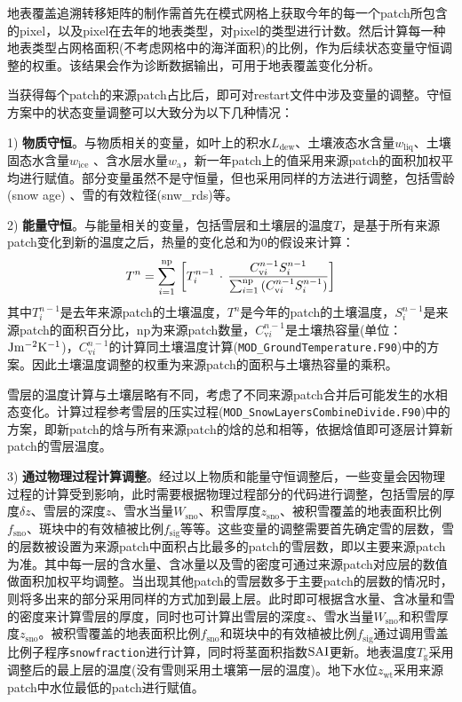 地表覆盖追溯转移矩阵的制作需首先在模式网格上获取今年的每一个patch所包含的pixel，以及pixel在去年的地表类型，对pixel的类型进行计数。然后计算每一种地表类型占网格面积(不考虑网格中的海洋面积)的比例，作为后续状态变量守恒调整的权重。该结果会作为诊断数据输出，可用于地表覆盖变化分析。

当获得每个patch的来源patch占比后，即可对restart文件中涉及变量的调整。守恒方案中的状态变量调整可以大致分为以下几种情况：


1) \textbf{物质守恒}。与物质相关的变量，如叶上的积水$L_{\mathrm{dew}}$、土壤液态水含量$w_{\mathrm{liq}}$、土壤固态水含量$w_{\mathrm{ice}}$
、含水层水量$w_{\mathrm{a}}$，新一年patch上的值采用来源patch的面积加权平均进行赋值。部分变量虽然不是守恒量，但也采用同样的方法进行调整，包括雪龄 (snow age) 、雪的有效粒径(snw\_rds)等。

2) \textbf{能量守恒}。与能量相关的变量，包括雪层和土壤层的温度$T$，是基于所有来源patch变化到新的温度之后，热量的变化总和为0的假设来计算：
\begin{equation}
  T^{n} = \sum_{i = 1}^{\rm np}{\,\left[ T_{i}^{n - 1}\,\cdot\,\frac{C_{\mathrm{v}i}^{n - 1} S_{i}^{n - 1}}{\sum_{i = 1}^{\rm np}{(C_{\mathrm{v}i}^{n - 1} S_{i}^{n - 1})}}\right]}
\end{equation}
其中\(T_{i}^{n - 1}\)是去年来源patch的土壤温度，\(T^{n}\)是今年的patch的土壤温度，\(S_{i}^{n - 1}\)是来源patch的面积百分比，np为来源patch数量，\(C_{\mathrm{v}i}^{n - 1}\)是土壤热容量(单位：\( \rm Jm^{-2}K^{-1}\))，\(C_{\mathrm{v}i}^{n - 1}\)的计算同土壤温度计算(\texttt{MOD\_GroundTemperature.F90})中的方案。因此土壤温度调整的权重为来源patch的面积与土壤热容量的乘积。

雪层的温度计算与土壤层略有不同，考虑了不同来源patch合并后可能发生的水相态变化。计算过程参考雪层的压实过程(\texttt{MOD\_SnowLayersCombineDivide.F90})中的方案，即新patch的焓与所有来源patch的焓的总和相等，依据焓值即可逐层计算新patch的雪层温度。

3) \textbf{通过物理过程计算调整}。经过以上物质和能量守恒调整后，一些变量会因物理过程的计算受到影响，此时需要根据物理过程部分的代码进行调整，包括雪层的厚度$\delta z$、雪层的深度$z$、雪水当量$W_{\mathrm{sno}}$、积雪厚度$z_{\mathrm{sno}}$、被积雪覆盖的地表面积比例$f_{\mathrm{sno}}$、斑块中的有效植被比例$f_{\mathrm{sig}}$等等。这些变量的调整需要首先确定雪的层数，雪的层数被设置为来源patch中面积占比最多的patch的雪层数，即以主要来源patch为准。其中每一层的含水量、含冰量以及雪的密度可通过来源patch对应层的数值做面积加权平均调整。当出现其他patch的雪层数多于主要patch的层数的情况时，则将多出来的部分采用同样的方式加到最上层。此时即可根据含水量、含冰量和雪的密度来计算雪层的厚度，同时也可计算出雪层的深度$z$、雪水当量$W_{\mathrm{sno}}$和积雪厚度$z_{\mathrm{sno}}$。被积雪覆盖的地表面积比例$f_{\mathrm{sno}}$和斑块中的有效植被比例$f_{\mathrm{sig}}$通过调用雪盖比例子程序\texttt{snowfraction}进行计算，同时将茎面积指数$\rm SAI$更新。地表温度$T_{\mathrm{g}}$采用调整后的最上层的温度(没有雪则采用土壤第一层的温度)。地下水位$z_{\mathrm{wt}}$采用来源patch中水位最低的patch进行赋值。

